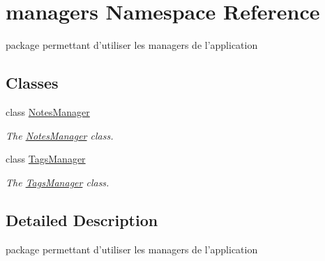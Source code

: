 \hypertarget{namespacemanagers}{\section{managers Namespace Reference}
\label{namespacemanagers}
}


package permettant d'utiliser les managers de l'application  


\subsection*{Classes}
\begin{DoxyCompactItemize}
\item 
class \hyperlink{classmanagers_1_1_notes_manager}{Notes\-Manager}
\begin{DoxyCompactList}\small\item\em The \hyperlink{classmanagers_1_1_notes_manager}{Notes\-Manager} class. \end{DoxyCompactList}\item 
class \hyperlink{classmanagers_1_1_tags_manager}{Tags\-Manager}
\begin{DoxyCompactList}\small\item\em The \hyperlink{classmanagers_1_1_tags_manager}{Tags\-Manager} class. \end{DoxyCompactList}\end{DoxyCompactItemize}


\subsection{Detailed Description}
package permettant d'utiliser les managers de l'application 